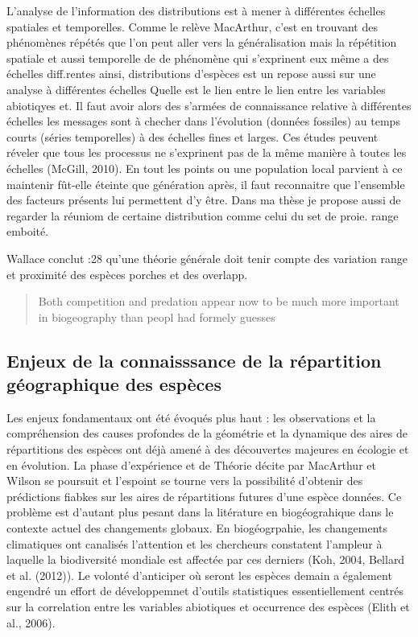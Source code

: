 L'analyse de l'information des distributions est à mener à différentes
échelles spatiales et temporelles. Comme le relève MacArthur, c'est en
trouvant des phénomènes répétés que l'on peut aller vers la
généralisation mais la répétition spatiale et aussi temporelle de de
phénomène qui s'exprinent eux même a des échelles diff.rentes ainsi,
distributions d'espèces est un repose aussi sur une analyse à
différentes échelles Quelle est le lien entre le lien entre les
variables abiotiqyes et. Il faut avoir alors des s'armées de
connaissance relative à différentes échelles les messages sont à checher
dans l'évolution (données fossiles) au temps courts (séries temporelles)
à des échelles fines et larges. Ces études peuvent réveler que tous les
processus ne s'exprinent pas de la même manière à toutes les échelles
(McGill, 2010). En tout les points ou une population local parvient à ce
maintenir fût-elle éteinte que génération après, il faut reconnaitre que
l'ensemble des facteurs présents lui permettent d'y être. Dans ma thèse
je propose aussi de regarder la réuniom de certaine distribution comme
celui du set de proie. range emboité.

Wallace conclut :28 qu'une théorie générale doit tenir compte des
variation range et proximité des espèces porches et des overlapp.

\begin{quote}
Both competition and predation appear now to be much more important in
biogeography than peopl had formely guesses
\end{quote}

\subsection*{Enjeux de la connaisssance de la répartition géographique
des
espèces}\label{enjeux-de-la-connaisssance-de-la-ruxe9partition-guxe9ographique-des-espuxe8ces}

Les enjeux fondamentaux ont été évoqués plus haut : les observations et
la compréhension des causes profondes de la géométrie et la dynamique
des aires de répartitions des espèces ont déjà amené à des découvertes
majeures en écologie et en évolution. La phase d'expérience et de
Théorie décite par MacArthur et Wilson se poursuit et l'espoint se
tourne vers la possibilité d'obtenir des prédictions fiabkes sur les
aires de répartitions futures d'une espèce données. Ce problème est
d'autant plus pesant dans la litérature en biogéograhique dans le
contexte actuel des changements globaux. En biogéogrpahie, les
changements climatiques ont canalisés l'attention et les chercheurs
constatent l'ampleur à laquelle la biodiversité mondiale est affectée
par ces derniers (Koh, 2004, Bellard et al. (2012)). Le volonté
d'anticiper où seront les espèces demain a également engendré un effort
de développemnet d'outils statistiques essentiellement centrés sur la
correlation entre les variables abiotiques et occurrence des espèces
(Elith et al., 2006).


